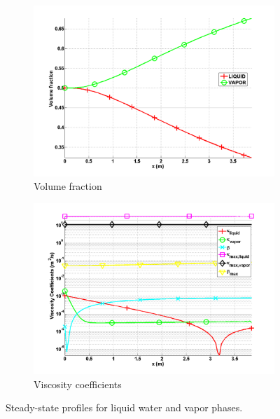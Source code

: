 \documentclass{anstrans}
\begin{document}
\begin{figure}[H]
        \begin{subfigure}[b]{0.495\textwidth}
                \centering
                \includegraphics[width=\textwidth]{plots/ANS_WINTER_2014_7Eqn_volume_fraction.png}
                \caption{Volume fraction}
                \label{fig:volume_fraction}
        \end{subfigure}
        
        \begin{subfigure}[b]{0.495\textwidth}
                \centering
                \includegraphics[width=\textwidth]{plots/ANS_WINTER_2014_7Eqn_viscosity.png}
                \caption{Viscosity coefficients}
                \label{fig:viscosity_coeff}
        \end{subfigure}        
        \caption{Steady-state profiles for liquid water and vapor phases.}
				\label{fig:2d_hump}
\end{figure}
%
\end{document}
